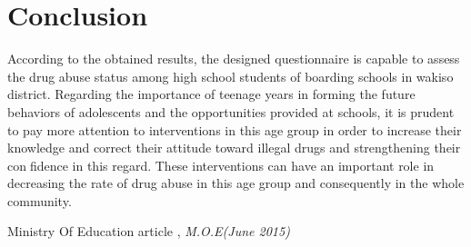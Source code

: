 \documentclass[options]{article}
\begin{document}
\section{\textbf{Conclusion}}
According to the obtained results, the designed questionnaire is capable to assess the drug abuse status among high school students of boarding schools in wakiso district. Regarding the importance of teenage years in forming the future behaviors of adolescents and the opportunities provided at schools, it is prudent to pay more attention to interventions in this age group in order to increase their knowledge and correct their attitude toward illegal drugs and strengthening their confidence in this regard. These interventions can have an important role in decreasing the rate of drug abuse in this age group
and consequently in the whole community.

\begin{thebibliography}{10} Ministry Of Education article , \emph{M.O.E(June 2015)} \end{thebibliography}
\end{document}
